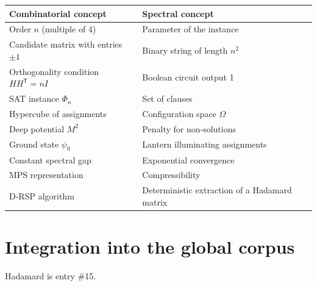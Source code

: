 \documentclass[11pt,a4paper]{article}
\begin{document}
\begin{center}
\small
\begin{tabular}{@{}l|l@{}}
\toprule
\textbf{Combinatorial concept} & \textbf{Spectral concept} \\
\midrule
Order $n$ (multiple of 4) & Parameter of the instance \\
Candidate matrix with entries $\pm1$ & Binary string of length $n^2$ \\
Orthogonality condition $H H^{\mathsf T}=nI$ & Boolean circuit output 1 \\
SAT instance $\Phi_n$ & Set of clauses \\
Hypercube of assignments & Configuration space $\Omega$ \\
Deep potential $M^2$ & Penalty for non‑solutions \\
Ground state $\psi_0$ & Lantern illuminating assignments \\
Constant spectral gap & Exponential convergence \\
MPS representation & Compressibility \\
D‑RSP algorithm & Deterministic extraction of a Hadamard matrix \\
\bottomrule
\end{tabular}
\end{center}

\section{Integration into the global corpus}

Hadamard is entry \#15.
\end{document}
